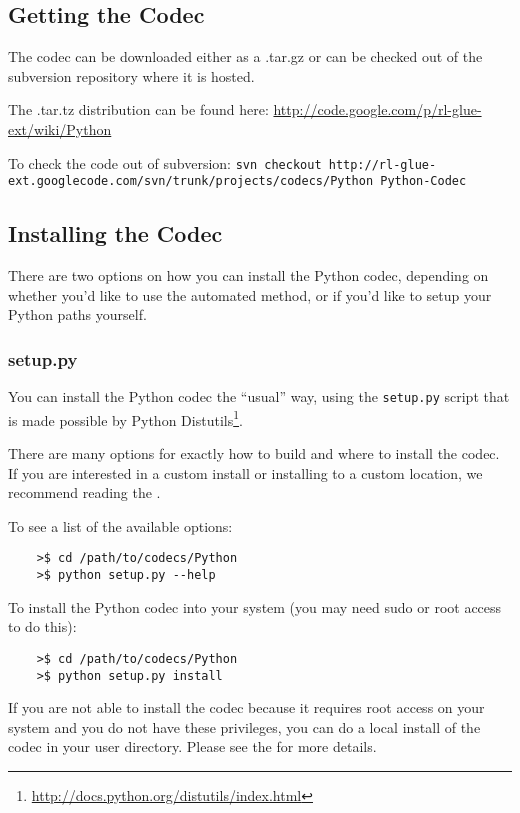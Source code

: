\documentclass[11pt]{article}
\begin{document}
\subsection{Getting the Codec}
The codec can be downloaded either as a .tar.gz or can be checked out of the subversion repository where it is hosted.

The .tar.tz distribution can be found here:\newline
\url{http://code.google.com/p/rl-glue-ext/wiki/Python}


To check the code out of subversion:\newline
\small \texttt{svn checkout http://rl-glue-ext.googlecode.com/svn/trunk/projects/codecs/Python Python-Codec} \normalsize

\subsection{Installing the Codec}
There are two options on how you can install the Python codec, depending on whether you'd like to use the automated method, or if you'd like to setup your Python paths yourself.

\subsubsection{setup.py}
You can install the Python codec the ``usual'' way, using the \texttt{setup.py} script that is made possible by Python Distutils\footnote{\url{http://docs.python.org/distutils/index.html}}.

There are many options for exactly how to build and where to install the codec.  If you are interested in a custom install or installing to a custom location, we recommend reading the .

To see a list of the available options:
\begin{verbatim}
	>$ cd /path/to/codecs/Python
	>$ python setup.py --help
\end{verbatim}

To install the Python codec into your system (you may need sudo or root access to do this):
\begin{verbatim}
	>$ cd /path/to/codecs/Python
	>$ python setup.py install
\end{verbatim}

If you are not able to install the codec because it requires root access on your system and you do not have these privileges, you can do a local install of the codec in your user directory.  Please see the   for more details.
\end{document}
